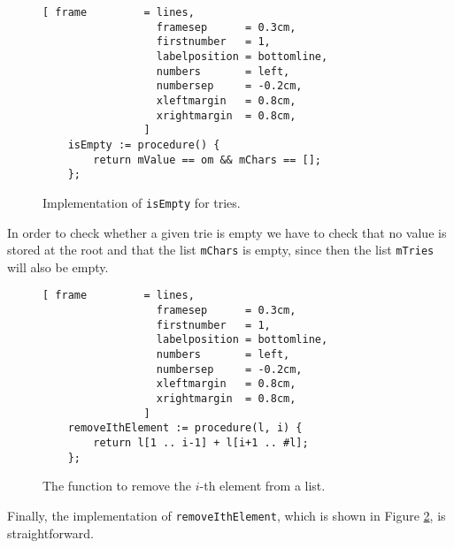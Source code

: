 \begin{figure}[!ht]
\centering
\begin{Verbatim}[ frame         = lines, 
                  framesep      = 0.3cm, 
                  firstnumber   = 1,
                  labelposition = bottomline,
                  numbers       = left,
                  numbersep     = -0.2cm,
                  xleftmargin   = 0.8cm,
                  xrightmargin  = 0.8cm,
                ]
    isEmpty := procedure() {
        return mValue == om && mChars == [];
    };
\end{Verbatim}
\vspace*{-0.3cm}
\caption{Implementation of \texttt{isEmpty} for tries.}
\label{fig:trie.stlx-isEmpty}
\end{figure}

In order to check whether a given trie is empty we have to check that no value is stored at the root
and that the list \texttt{mChars} is empty, since then the list \texttt{mTries} will also be empty.

\begin{figure}[!ht]
\centering
\begin{Verbatim}[ frame         = lines, 
                  framesep      = 0.3cm, 
                  firstnumber   = 1,
                  labelposition = bottomline,
                  numbers       = left,
                  numbersep     = -0.2cm,
                  xleftmargin   = 0.8cm,
                  xrightmargin  = 0.8cm,
                ]
    removeIthElement := procedure(l, i) {
        return l[1 .. i-1] + l[i+1 .. #l];
    };
\end{Verbatim}
\vspace*{-0.3cm}
\caption{The function to remove the $i$-th element from a list.}
\label{fig:trie.stlx-removeIthElement}
\end{figure}

Finally, the implementation of \texttt{removeIthElement}, which is shown in Figure
\ref{fig:trie.stlx-removeIthElement}, is straightforward. 


